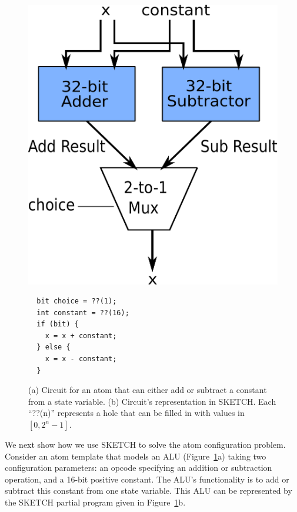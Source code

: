 \begin{figure}[h]
  \begin{minipage}{0.4\columnwidth}
  \begin{center}
  \includegraphics[width=\columnwidth]{circuit.pdf}
  \end{center}
  \end{minipage}
  \begin{minipage}{0.55\columnwidth}
  \begin{center}
  \begin{lstlisting}
  bit choice = ??(1);
  int constant = ??(16);
  if (bit) {
    x = x + constant;
  } else {
    x = x - constant;
  }
  \end{lstlisting}
  \end{center}
  \end{minipage}
\caption{\small (a) Circuit for an atom that can either add or subtract a
constant from a state variable.  (b) Circuit's representation in SKETCH.
Each ``??(n)'' represents a hole that can be filled in with values in
  $[0, 2^n -1]$.}
\label{fig:alu_in_sketch}
\end{figure}

We next show how we use SKETCH to solve the atom configuration problem.
Consider an atom template that models an ALU (Figure~\ref{fig:alu_in_sketch}a)
taking two configuration parameters: an opcode specifying an addition or
subtraction operation, and a 16-bit positive constant.  The ALU's functionality
is to add or subtract this constant from one state variable. This ALU can be
represented by the SKETCH partial program given in
Figure~\ref{fig:alu_in_sketch}b.

